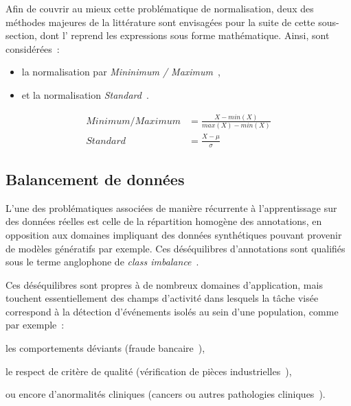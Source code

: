 Afin de couvrir au mieux cette problématique de normalisation, deux des méthodes majeures de la littérature sont envisagées pour la suite de cette sous-section, dont l' reprend les expressions sous forme mathématique. Ainsi, sont considérées~:
\begin{itemize}
    \item la normalisation par \textit{Mininimum / Maximum}~\cite{Juszczak2002},
    \item et la normalisation \textit{Standard}~\cite{Celebi2007}.
\end{itemize}\par

\begin{equation} 
    \label{eq:scaling_methods}
    \begin{split}
    Minimum/Maximum&=\frac{X-min(X)}{max(X)-min(X)}  \\
    Standard&=\frac{X-\mu{}}{\sigma}	    
    \end{split}
\end{equation}

\subsection{Balancement de données}
\label{subsec:balancement}
L'une des problématiques associées de manière récurrente à l'apprentissage sur des données réelles est celle de la répartition homogène des annotations, en opposition aux domaines impliquant des données synthétiques pouvant provenir de modèles génératifs par exemple. Ces déséquilibres d'annotations sont qualifiés sous le terme anglophone de \textit{class imbalance}~\cite{Prati2009, He2009}.\par

Ces déséquilibres sont propres à de nombreux domaines d'application, mais touchent essentiellement des champs d'activité dans lesquels la tâche visée correspond à la détection d'événements isolés au sein d'une population, comme par exemple~: 
\begin{inlinerate}
    \item les comportements déviants (fraude bancaire~\cite{Phua2004}),
    \item le respect de critère de qualité (vérification de pièces industrielles~\cite{Wu2018}),
    \item ou encore d'anormalités cliniques (cancers ou autres pathologies cliniques~\cite{Celebi2007}).
\end{inlinerate}\par

